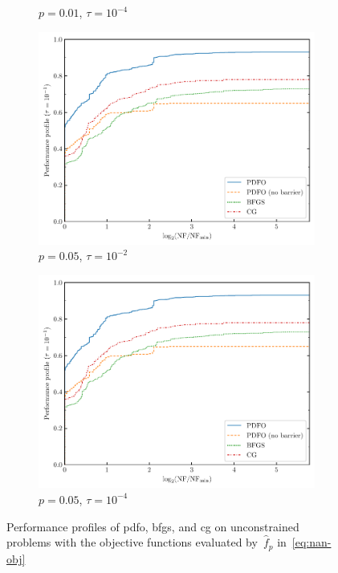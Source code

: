 \documentclass[
    smallextended,  %
    final,          %
]{svjour3}
\newcommand{\obj}{f}
\begin{document}
\begin{figure}[htbp]
\begin{subfigure}{.45\textwidth}
        \caption{$p = 0.01$, $\tau = 10^{-4}$}
    \end{subfigure}
    \hfill
    \begin{subfigure}{.45\textwidth}
        \centering
        \includegraphics[width=\textwidth,page=2]{perf-nan-bfgs_cg_pdfo-50-10-0.01.pdf}
        \caption{$p = 0.05$, $\tau = 10^{-2}$}
    \end{subfigure}
    \hfill
    \begin{subfigure}{.45\textwidth}
        \centering
        \includegraphics[width=\textwidth,page=4]{perf-nan-bfgs_cg_pdfo-50-10-0.01.pdf}
        \caption{$p = 0.05$, $\tau = 10^{-4}$}
    \end{subfigure}
    \caption{Performance profiles of \gls{pdfo}, \gls{bfgs}, and \gls{cg} on unconstrained problems
    with the objective functions evaluated by~$\hat{\obj}_p$ in~\eqref{eq:nan-obj}}
    \label{fig:nan}
\end{figure}
\end{document}
